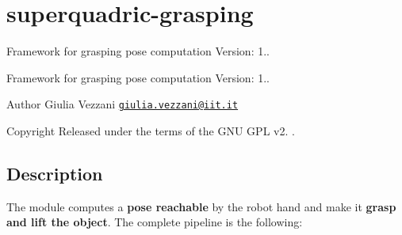 \section{superquadric-\/grasping}
\label{group__superquadric-grasping}


Framework for grasping pose computation Version\-: 1..  


Framework for grasping pose computation Version\-: 1.. \begin{DoxyAuthor}{Author}
Giulia Vezzani \href{mailto:giulia.vezzani@iit.it}{\tt giulia.\-vezzani@iit.\-it} \par
 
\end{DoxyAuthor}
\begin{DoxyCopyright}{Copyright}
Released under the terms of the G\-N\-U G\-P\-L v2. . 
\end{DoxyCopyright}
\hypertarget{group__superquadric-grasping_intro_sec}{}\subsection{Description}\label{group__superquadric-grasping_intro_sec}
The module computes a {\bfseries  pose reachable} by the robot hand and make it {\bfseries grasp and lift the object}. The complete pipeline is the following\-:


